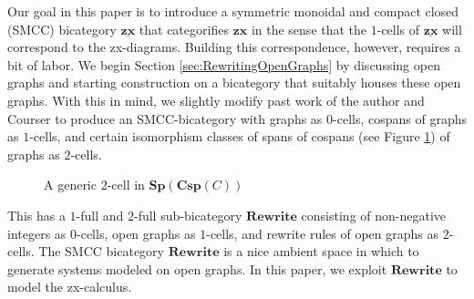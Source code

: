 \documentclass[]{amsart}
\theoremstyle{defn}
\begin{document}
Our goal in this paper is to introduce a symmetric monoidal and compact closed (SMCC) bicategory $\underline{\mathbf{zx}}$ that categorifies $\mathbf{zx}$ in the sense that the $1$-cells of $\underline{\mathbf{zx}}$ will correspond to the zx-diagrams.  Building this correspondence, however, requires a bit of labor. We begin Section \ref{sec:RewritingOpenGraphs} by discussing open graphs and starting construction on a bicategory that suitably houses these open graphs.  With this in mind, we slightly modify past work of the author and Courser \cite{Cicala_SpansCospans, CicalaCourser_BicatSpansCospan} to produce an SMCC-bicategory with graphs as $0$-cells, cospans of graphs as $1$-cells, and certain isomorphism classes of spans of cospans (see Figure \ref{fig:spans of cospans}) of graphs as $2$-cells.   
\begin{figure}
	\caption{A generic $2$-cell in $\mathbf{Sp}(\mathbf{Csp}(C))$}
	\label{fig:spans of cospans}
\end{figure}
This has a $1$-full and $2$-full sub-bicategory $\mathbf{Rewrite}$ consisting of non-negative integers as $0$-cells, open graphs as $1$-cells, and rewrite rules of open graphs as $2$-cells.  The SMCC bicategory $\mathbf{Rewrite}$ is a nice ambient space in which to generate systems modeled on open graphs.  In this paper, we exploit $\mathbf{Rewrite}$ to model the zx-calculus.
\end{document}
